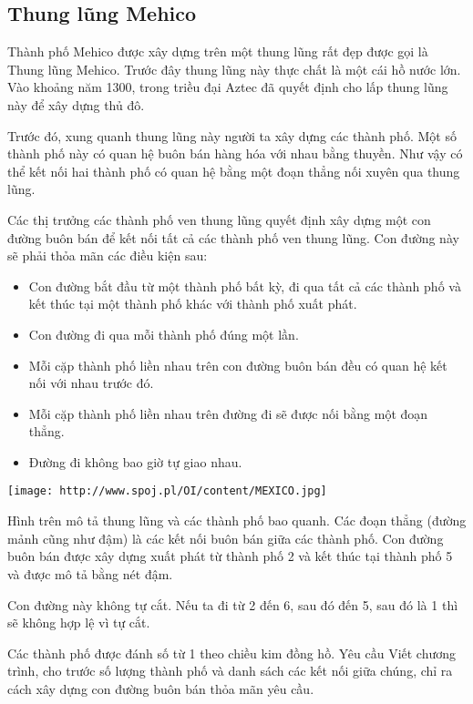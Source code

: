 \subsection{   Thung lũng Mehico  }

   Thành phố Mehico được xây dựng trên một thung lũng rất đẹp được gọi là Thung lũng Mehico. Trước đây thung lũng này thực chất là một cái hồ nước lớn. Vào khoảng năm 1300, trong triều đại Aztec đã quyết định cho lấp thung lũng này để xây dựng thủ đô.  

   Trước đó, xung quanh thung lũng này người ta xây dựng các thành phố. Một số thành phố này có quan hệ buôn bán hàng hóa với nhau bằng thuyền. Như vậy có thể kết nối hai thành phố có quan hệ bằng một đoạn thẳng nối xuyên qua thung lũng.  

   Các thị trưởng các thành phố ven thung lũng quyết định xây dựng một con đường buôn bán để kết nối tất cả các thành phố ven thung lũng. Con đường này sẽ phải thỏa mãn các điều kiện sau:  
\begin{itemize}
	\item     Con đường bắt đầu từ một thành phố bất kỳ, đi qua tất cả các thành phố và kết thúc tại một thành phố khác với thành phố xuất phát.   
	\item     Con đường đi qua mỗi thành phố đúng một lần.   
	\item     Mỗi cặp thành phố liền nhau trên con đường buôn bán đều có quan hệ kết nối với nhau trước đó.   
	\item     Mỗi cặp thành phố liền nhau trên đường đi sẽ được nối bằng một đoạn thẳng.   
	\item     Đường đi không bao giờ tự giao nhau.   
\end{itemize}


\texttt{[image: http://www.spoj.pl/OI/content/MEXICO.jpg]}

   Hình trên mô tả thung lũng và các thành phố bao quanh. Các đoạn thẳng (đường mảnh cũng như đậm) là các kết nối buôn bán giữa các thành phố. Con đường buôn bán được xây dựng xuất phát từ thành phố 2 và kết thúc tại thành phố 5 và được mô tả bằng nét đậm.  

   Con đường này không tự cắt. Nếu ta đi từ 2 đến 6, sau đó đến 5, sau đó là 1 thì sẽ không hợp lệ vì tự cắt.  

   Các thành phố được đánh số từ 1 theo chiều kim đồng hồ.
   Yêu cầu  
Viết chương trình, cho trước số lượng thành phố và danh sách các kết nối giữa chúng, chỉ ra cách xây dựng con đường buôn bán thỏa mãn yêu cầu.